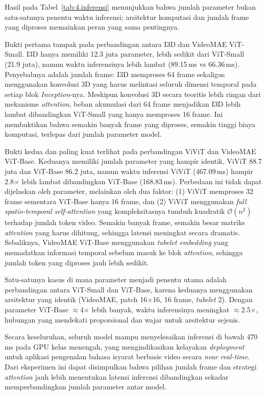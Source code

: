 Hasil pada Tabel~\ref{tab:4.inferensi} menunjukkan bahwa jumlah parameter bukan satu-satunya penentu waktu inferensi; arsitektur komputasi dan jumlah frame yang diproses memainkan peran yang sama pentingnya.\par

Bukti pertama tampak pada perbandingan antara I3D dan VideoMAE ViT-Small. I3D hanya memiliki 12.3 juta parameter, lebih sedikit dari ViT-Small (21.9 juta), namun waktu inferensinya lebih lambat (89.15\,ms vs 66.36\,ms). Penyebabnya adalah jumlah frame: I3D memproses 64 frame sekaligus menggunakan konvolusi 3D yang harus melintasi seluruh dimensi temporal pada setiap blok \textit{Inception}-nya. Meskipun konvolusi 3D secara teoritis lebih ringan dari mekanisme \textit{attention}, beban akumulasi dari 64 frame menjadikan I3D lebih lambat dibandingkan ViT-Small yang hanya memproses 16 frame. Ini membuktikan bahwa semakin banyak frame yang diproses, semakin tinggi biaya komputasi, terlepas dari jumlah parameter model.\par

Bukti kedua dan paling kuat terlihat pada perbandingan ViViT dan VideoMAE ViT-Base. Keduanya memiliki jumlah parameter yang hampir identik, ViViT 88.7 juta dan ViT-Base 86.2 juta, namun waktu inferensi ViViT (467.09\,ms) hampir 2.8$\times$ lebih lambat dibandingkan ViT-Base (168.83\,ms). Perbedaan ini tidak dapat dijelaskan oleh parameter, melainkan oleh dua faktor: (1) ViViT memproses 32 frame sementara ViT-Base hanya 16 frame, dan (2) ViViT menggunakan \textit{full spatio-temporal self-attention} yang kompleksitasnya tumbuh kuadratik $\mathcal{O}(n^2)$ terhadap jumlah token video. Semakin banyak frame, semakin besar matriks \textit{attention} yang harus dihitung, sehingga latensi meningkat secara dramatis. Sebaliknya, VideoMAE ViT-Base menggunakan \textit{tubelet embedding} yang memadatkan informasi temporal sebelum masuk ke blok \textit{attention}, sehingga jumlah token yang diproses jauh lebih sedikit.\par

Satu-satunya kasus di mana parameter menjadi penentu utama adalah perbandingan antara ViT-Small dan ViT-Base, karena keduanya menggunakan arsitektur yang identik (VideoMAE, patch 16$\times$16, 16 frame, \textit{tubelet} 2). Dengan parameter ViT-Base $\approx$4$\times$ lebih banyak, waktu inferensinya meningkat $\approx$2.5$\times$, hubungan yang mendekati proporsional dan wajar untuk arsitektur sejenis.\par

Secara keseluruhan, seluruh model mampu menyelesaikan inferensi di bawah 470\,ms pada GPU kelas menengah, yang mengindikasikan kelayakan \textit{deployment} untuk aplikasi pengenalan bahasa isyarat berbasis video secara \textit{near real-time}. Dari eksperimen ini dapat disimpulkan bahwa pilihan jumlah frame dan strategi \textit{attention} jauh lebih menentukan latensi inferensi dibandingkan sekadar memperbandingkan jumlah parameter antar model.\par


